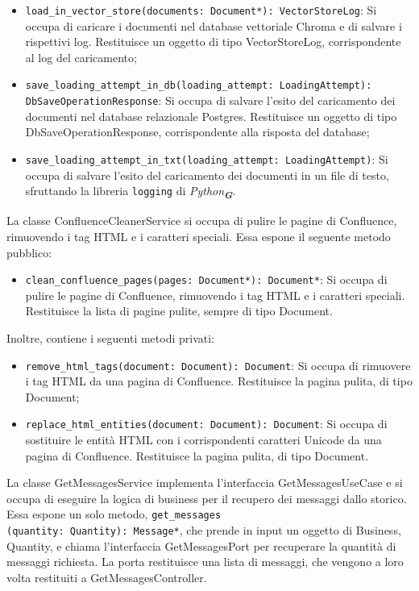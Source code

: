 \begin{itemize}
    \item \texttt{load\_in\_vector\_store(documents: Document*): VectorStoreLog}: Si occupa di caricare i documenti nel database vettoriale Chroma e di salvare i rispettivi log. Restituisce un oggetto di tipo VectorStoreLog, corrispondente al log del caricamento;
    \item \texttt{save\_loading\_attempt\_in\_db(loading\_attempt: LoadingAttempt):\\ DbSaveOperationResponse}: Si occupa di salvare l'esito del caricamento dei documenti nel database relazionale Postgres. Restituisce un oggetto di tipo DbSaveOperationResponse, corrispondente alla risposta del database;
    \item \texttt{save\_loading\_attempt\_in\_txt(loading\_attempt: LoadingAttempt)}: Si occupa di salvare l'esito del caricamento dei documenti in un file di testo, sfruttando la libreria \texttt{logging} di \emph{Python}\textsubscript{\textbf{\textit{G}}}.
\end{itemize}

\label{sec:confluence_cleaner_service}
La classe ConfluenceCleanerService si occupa di pulire le pagine di Confluence, rimuovendo i tag HTML e i caratteri speciali. Essa espone il seguente metodo pubblico:
\begin{itemize}
    \item \texttt{clean\_confluence\_pages(pages: Document*): Document*}: Si occupa di pulire le pagine di Confluence, rimuovendo i tag HTML e i caratteri speciali. Restituisce la lista di pagine pulite, sempre di tipo Document.
\end{itemize}
Inoltre, contiene i seguenti metodi privati:
\begin{itemize}
    \item \texttt{remove\_html\_tags(document: Document): Document}: Si occupa di rimuovere i tag HTML da una pagina di Confluence. Restituisce la pagina pulita, di tipo Document;
    \item \texttt{replace\_html\_entities(document: Document): Document}: Si occupa di sostituire le entità HTML con i corrispondenti caratteri Unicode da una pagina di Confluence. Restituisce la pagina pulita, di tipo Document.
\end{itemize}

\label{sec:get_messages_service}
La classe GetMessagesService implementa l'interfaccia GetMessagesUseCase e si occupa di eseguire la logica di business per il recupero dei messaggi dallo storico. Essa espone un solo metodo, \texttt{get\_messages\\(quantity: Quantity): Message*}, che prende in input un oggetto di Business, Quantity, e chiama l'interfaccia GetMessagesPort per recuperare la quantità di messaggi richiesta. La porta restituisce una lista di messaggi, che vengono a loro volta restituiti a GetMessagesController.

